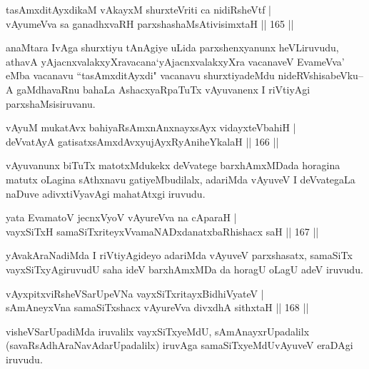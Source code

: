 \begin{shl}
tasAmxditAyxdikaM vAkayxM shurxteVriti ca nidiRsheVtf |\\
vAyumeVva sa ganadhxvaRH parxshashaMsAtivisimxtaH \hfill || 165 ||
\end{shl}

\begin{artha}
anaMtara IvAga shurxtiyu tAnAgiye uLida parxshenxyanunx heVLiruvudu, athavA yAjacnxvalakxyXravacana`yAjacnxvalakxyXra vacanaveV EvameVva' eMba vacanavu ``tasAmxditAyxdi" vacanavu shurxtiyadeMdu nideRVshisabeVku--A gaMdhavaRnu bahaLa AshacxyaRpaTuTx vAyuvanenx I riVtiyAgi parxshaMsisiruvanu.
\end{artha}


\begin{shl}
vAyuM mukatAvx bahiyaRsAmxnAnxnayxsAyx vidayxteV\s bahiH |\\
deVvatAyA gatisatxsAmxdAvxyujAyxRyAniheYkalaH \hfill || 166 ||
\end{shl}

\begin{artha}
vAyuvanunx biTuTx matotxMdukekx deVvatege barxhAmxMDada horagina matutx oLagina sAthxnavu gatiyeMbudilalx, adariMda vAyuveV I deVvategaLa naDuve adivxtiVyavAgi mahatAtxgi iruvudu.
\end{artha}

\begin{shl}
yata EvamatoV jecnxVyoV vAyureVva na cAparaH |\\
vayxSiTxH samaSiTxriteyxVvamaNADxdanatxbaRhishacx saH \hfill || 167 ||
\end{shl}

\begin{artha}
yAvakAraNadiMda I riVtiyAgideyo adariMda vAyuveV parxshasatx, samaSiTx vayxSiTxyAgiruvudU saha ideV barxhAmxMDa da horagU oLagU adeV iruvudu.
\end{artha}


\begin{shl}
vAyxpitxviRsheVSarUpeVNa vayxSiTxritayxBidhiVyateV |\\
sAmAneyxVna samaSiTxshacx vAyureVva divxdhA sithxtaH \hfill || 168 ||
\end{shl}

\begin{artha}
visheVSarUpadiMda iruvalilx vayxSiTxyeMdU, sAmAnayxrUpadalilx (savaRsAdhAraNavAdarUpadalilx) iruvAga samaSiTxyeMdUvAyuveV eraDAgi iruvudu.
\end{artha}

